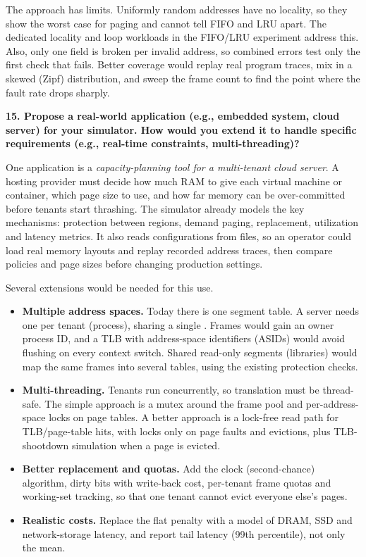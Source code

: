 \documentclass[11pt]{article}
\newcommand{\code}[1]{\texttt{\detokenize{#1}}}
\newcommand{\question}[1]{\par\medskip\noindent\textbf{#1}\par\smallskip}
\begin{document}
The approach has limits. Uniformly random addresses have no locality, so they show the worst case for
paging and cannot tell FIFO and LRU apart. The dedicated locality and loop workloads in the FIFO/LRU
experiment address this. Also, only one field is broken per invalid address, so combined errors
test only the first check that fails. Better coverage would replay real program traces, mix in a
skewed (Zipf) distribution, and sweep the frame count to find the point where the fault rate
drops sharply.

\question{15. Propose a real-world application (e.g., embedded system, cloud server) for your simulator. How would you extend it to handle specific requirements (e.g., real-time constraints, multi-threading)?}
One application is a \emph{capacity-planning tool for a multi-tenant cloud server}. A hosting
provider must decide how much RAM to give each virtual machine or container, which page size to use,
and how far memory can be over-committed before tenants start thrashing. The simulator already
models the key mechanisms: protection between regions, demand paging, replacement, utilization and latency
metrics. It also reads configurations from files, so an operator could load real memory layouts and
replay recorded address traces, then compare policies and page sizes before changing production
settings.

Several extensions would be needed for this use.
\begin{itemize}
  \item \textbf{Multiple address spaces.} Today there is one segment table. A server needs one per
        tenant (process), sharing a single \code{PhysicalMemory}. Frames would gain an owner
        process ID, and a TLB with address-space identifiers (ASIDs) would avoid flushing on every
        context switch. Shared read-only segments (libraries) would map the same frames into
        several tables, using the existing protection checks.
  \item \textbf{Multi-threading.} Tenants run concurrently, so translation must be thread-safe. The
        simple approach is a mutex around the frame pool and per-address-space locks on page tables.
        A better approach is a lock-free read path for TLB/page-table hits, with locks only on page faults
        and evictions, plus TLB-shootdown simulation when a page is evicted.
  \item \textbf{Better replacement and quotas.} Add the clock (second-chance) algorithm, dirty bits
        with write-back cost, per-tenant frame quotas and working-set tracking, so that one tenant cannot
        evict everyone else's pages.
  \item \textbf{Realistic costs.} Replace the flat penalty with a model of DRAM, SSD and network-storage latency,
        and report tail latency (99th percentile), not only the mean.
\end{itemize}
\end{document}
